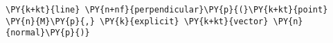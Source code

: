 \begin{Verbatim}[commandchars=\\\{\}]
    \PY{k+kt}{line} \PY{n+nf}{perpendicular}\PY{p}{(}\PY{k+kt}{point} \PY{n}{M}\PY{p}{,} \PY{k}{explicit} \PY{k+kt}{vector} \PY{n}{normal}\PY{p}{)}
\end{Verbatim}
